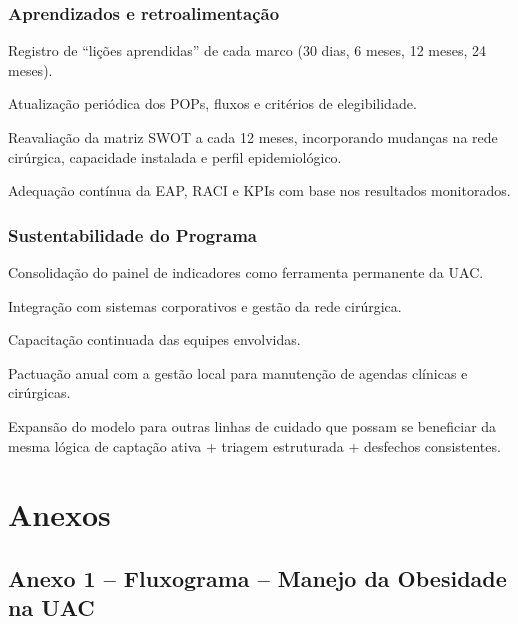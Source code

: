 \documentclass[12pt]{article}
\begin{document}
\subsubsection{Aprendizados e retroalimentação}
\label{sec:org6fa8c63}
\begin{hlevelthree}
\item Registro de “lições aprendidas” de cada marco (30 dias, 6 meses, 12 meses, 24 meses).
\item Atualização periódica dos POPs, fluxos e critérios de elegibilidade.
\item Reavaliação da matriz SWOT a cada 12 meses, incorporando mudanças na rede cirúrgica, capacidade instalada e perfil epidemiológico.
\item Adequação contínua da EAP, RACI e KPIs com base nos resultados monitorados.
\end{hlevelthree}

\subsubsection{Sustentabilidade do Programa}
\label{sec:org5b69c45}
\begin{hlevelthree}
\item Consolidação do painel de indicadores como ferramenta permanente da UAC.
\item Integração com sistemas corporativos e gestão da rede cirúrgica.
\item Capacitação continuada das equipes envolvidas.
\item Pactuação anual com a gestão local para manutenção de agendas clínicas e cirúrgicas.
\item Expansão do modelo para outras linhas de cuidado que possam se beneficiar da mesma lógica de captação ativa + triagem estruturada + desfechos consistentes.
\end{hlevelthree}

\FGVNewPage
\section{Anexos}
\label{sec:orgf8eab74}
\subsection{Anexo 1 – Fluxograma – Manejo da Obesidade na UAC}
\label{sec:orgd50365f}
\begin{center}

\label{org2b0957a}
\end{center}
\end{document}
